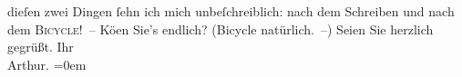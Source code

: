 \begin{ledgroupsized}[t]{13cm}
               dieſen zwei Dingen ſehn ich mich unbeſchreiblich: nach dem Schreiben und nach dem \textsc{Bicycle}! – Kö{\geminationn}en Sie’s endlich?
               (Bicycle natürlich. –)\pend
           \pstart
           Seien Sie herzlich gegrüßt. Ihr{\\[\baselineskip]}\spacefill\mbox{Arthur.}\pend
           \leftskip=0em{}\endnumbering{}\end{ledgroupsized}  \newcommand{\dateiname}{L00678}\newcommand{\titel}{Arthur Schnitzler an Richard Beer-Hofmann, 20. 5. 1897}\newcommand{\editorInnen}{ Martin Anton Müller und Gerd-Hermann Susen}
      